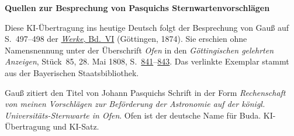 \clearpage\thispagestyle{empty}
\begin{center}\textbf{Quellen zur Besprechung von Pasquichs Sternwartenvorschlägen}\end{center}
\noindent Diese KI-Übertragung ins heutige Deutsch folgt der Besprechung von Gauß auf S.~497--498 der \href{https://gdz.sub.uni-goettingen.de/id/PPN236007467}{\textit{Werke}, Bd.~VI} (Göttingen, 1874). Sie erschien ohne Namensnennung unter der Überschrift \emph{Ofen} in den \textit{Göttingischen gelehrten Anzeigen}, Stück~85, 28. Mai 1808, S.~\href{https://api.digitale-sammlungen.de/iiif/image/v2/bsb10538673_00847/full/1800,/0/default.jpg}{841}--\href{https://api.digitale-sammlungen.de/iiif/image/v2/bsb10538673_00849/full/1800,/0/default.jpg}{843}. Das verlinkte Exemplar stammt aus der Bayerischen Staatsbibliothek.
\par\smallskip\noindent Gauß zitiert den Titel von Johann Pasquichs Schrift in der Form \emph{Rechenschaft von meinen Vorschlägen zur Beförderung der Astronomie auf der königl. Universitäts-Sternwarte in Ofen}. Ofen ist der deutsche Name für Buda. KI-Übertragung und KI-Satz.
\clearpage
